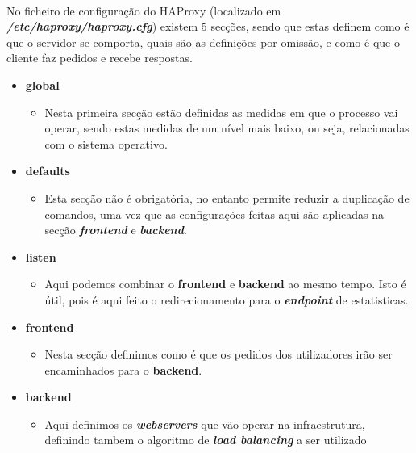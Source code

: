 \documentclass{report}
\begin{document}
\paragraph{}
No ficheiro de configuração do HAProxy (localizado em \textbf{\emph{/etc/haproxy/haproxy.cfg}}) existem 5 secções, sendo que estas definem como é que o servidor se comporta, quais são as definições por omissão, e como é que o cliente faz pedidos e recebe respostas.
\begin{itemize}
  \item \textbf{global}
    \begin{itemize}
      \item Nesta primeira secção estão definidas as medidas em que o processo vai operar, sendo estas medidas de um nível mais baixo, ou seja, relacionadas com o sistema operativo.
    \end{itemize}
          
  \item \textbf{defaults}
    \begin{itemize}
      \item Esta secção não é obrigatória, no entanto permite reduzir a duplicação de comandos, uma vez que as configurações feitas aqui são aplicadas na secção \textbf{\emph{frontend}} e \textbf{\emph{backend}}.
    \end{itemize}
      
  \item \textbf{listen}
    \begin{itemize}
      \item Aqui podemos combinar o \textbf{frontend} e \textbf{backend} ao mesmo tempo. Isto é útil, pois é aqui feito o redirecionamento para o \textbf{\emph{endpoint}} de estatisticas.
     \end{itemize}
      
   \item \textbf{frontend}
     \begin{itemize}
       \item Nesta secção definimos como é que os pedidos dos utilizadores irão ser encaminhados para o \textbf{backend}.
     \end{itemize}

       
   \item \textbf{backend}
     \begin{itemize}
       \item Aqui definimos os \textbf{\emph{webservers}} que vão operar na infraestrutura, definindo tambem o algoritmo de \textbf{\emph{load balancing}} a ser utilizado
     \end{itemize}
\end{itemize}
\end{document}
